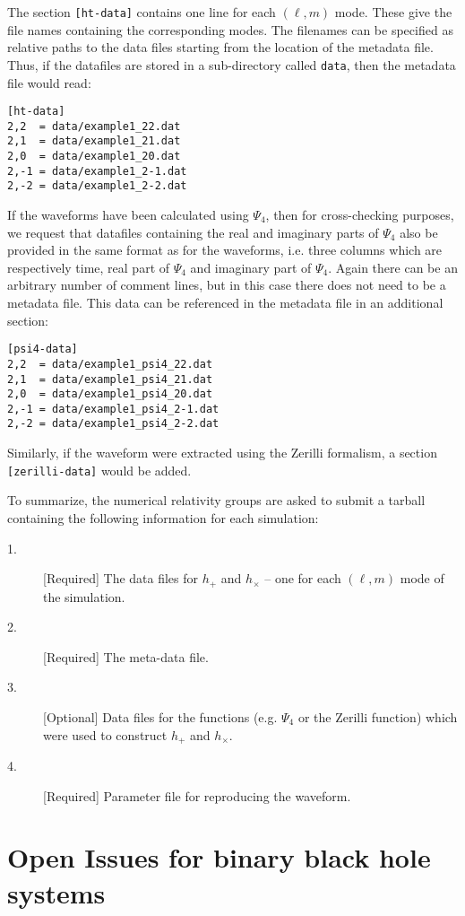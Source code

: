 \documentclass[prd,preprintnumbers,superscriptaddress,eqsecnum]{revtex4}
\numberwithin{equation}{section}
\begin{document}
{The section \texttt{[ht-data]} contains one line for each $(\ell,m)$
mode.  These give the file names containing the corresponding modes.
The filenames can be specified as relative paths to the data files
starting from the location of the metadata file.  Thus, if the
datafiles are stored in a sub-directory called \texttt{data}, then the
metadata file would read:
\begin{verbatim}
[ht-data]
2,2  = data/example1_22.dat
2,1  = data/example1_21.dat
2,0  = data/example1_20.dat
2,-1 = data/example1_2-1.dat
2,-2 = data/example1_2-2.dat
\end{verbatim}

If the waveforms have been calculated using $\Psi_4$, then for
cross-checking purposes, we request that datafiles containing the real
and imaginary parts of $\Psi_4$ also be provided in the same format as
for the waveforms, i.e. three columns which are respectively time, real
part of $\Psi_4$ and imaginary part of $\Psi_4$.  Again there can be an
arbitrary number of comment lines, but in this case there does not need
to be a metadata file.  This data can be referenced in the metadata
file in an additional section:

\begin{verbatim}
[psi4-data]
2,2  = data/example1_psi4_22.dat
2,1  = data/example1_psi4_21.dat
2,0  = data/example1_psi4_20.dat
2,-1 = data/example1_psi4_2-1.dat
2,-2 = data/example1_psi4_2-2.dat
\end{verbatim}

Similarly, if the waveform were extracted using the Zerilli formalism, a
section \texttt{[zerilli-data]} would be added.

To summarize, the numerical relativity groups are asked to submit a
tarball containing the following information for each simulation:
\begin{description}
\item[1.][Required] The data files for $h_+$ and $h_\times$ -- one for
  each $(\ell,m)$ mode of the simulation.
\item[2.][Required] The meta-data file.
\item[3.][Optional] Data files for the functions (e.g. $\Psi_4$ or the
  Zerilli function) which were used to construct $h_{+}$ and $h_{\times}$.
\item[4.][Required] Parameter file for reproducing the waveform.
\end{description}




\section{Open Issues for binary black hole systems}
\label{sec:openissues}

}
\end{document}
